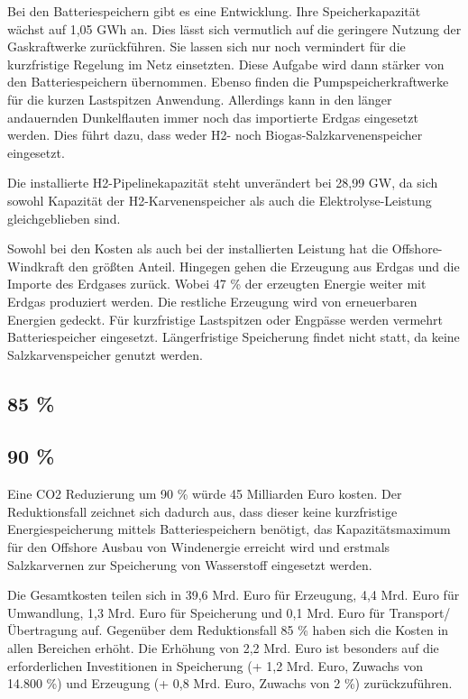 Bei den Batteriespeichern gibt es eine Entwicklung. Ihre Speicherkapazität wächst auf 1,05 GWh an. Dies lässt sich vermutlich auf die geringere Nutzung der Gaskraftwerke zurückführen. Sie lassen sich nur noch vermindert für die kurzfristige Regelung im Netz einsetzten. Diese Aufgabe wird dann stärker von den Batteriespeichern übernommen. Ebenso finden die Pumpspeicherkraftwerke für die kurzen Lastspitzen Anwendung. Allerdings kann in den länger andauernden Dunkelflauten immer noch das importierte Erdgas eingesetzt werden. Dies führt dazu, dass weder H2- noch Biogas-Salzkarvenenspeicher eingesetzt. 

Die installierte H2-Pipelinekapazität steht unverändert bei 28,99 GW, da sich sowohl Kapazität der H2-Karvenenspeicher als auch die Elektrolyse-Leistung gleichgeblieben sind.

Sowohl bei den Kosten als auch bei der installierten Leistung hat die Offshore-Windkraft den größten Anteil. Hingegen gehen die Erzeugung aus Erdgas und die Importe des Erdgases zurück. Wobei 47 \% der erzeugten Energie weiter mit Erdgas produziert werden. Die restliche Erzeugung wird von erneuerbaren Energien gedeckt. Für kurzfristige Lastspitzen oder Engpässe werden vermehrt Batteriespeicher eingesetzt. Längerfristige Speicherung findet nicht statt, da keine Salzkarvenspeicher genutzt werden.


\subsection{85 \%}

\subsection{90 \%}
Eine CO2 Reduzierung um 90 \% würde 45 Milliarden Euro kosten. Der Reduktionsfall zeichnet sich dadurch aus, dass dieser keine kurzfristige Energiespeicherung mittels Batteriespeichern benötigt, das Kapazitätsmaximum für den Offshore Ausbau von Windenergie erreicht wird und erstmals Salzkarvernen zur Speicherung von Wasserstoff eingesetzt werden.

Die Gesamtkosten teilen sich in 39,6 Mrd. Euro für Erzeugung, 4,4 Mrd. Euro für Umwandlung, 1,3 Mrd. Euro für Speicherung und 0,1 Mrd. Euro für Transport/Übertragung auf. Gegenüber dem Reduktionsfall 85 \% haben sich die Kosten in allen Bereichen erhöht. Die Erhöhung von 2,2 Mrd. Euro ist besonders auf die erforderlichen Investitionen in Speicherung (+ 1,2 Mrd. Euro, Zuwachs von 14.800 \%) und Erzeugung (+ 0,8 Mrd. Euro, Zuwachs von 2 \%) zurückzuführen.

